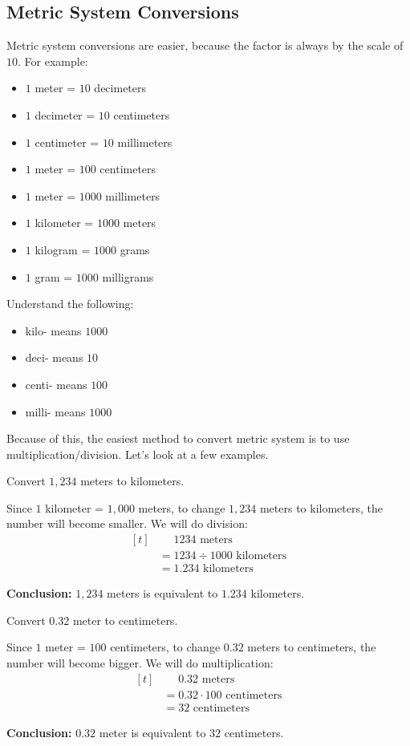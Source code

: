 \subsection{Metric System Conversions}
Metric system conversions are easier, because the factor is always by the scale of $10$. For example:
\begin{itemize}
\item $1$ meter = $10$ decimeters
\item $1$ decimeter = $10$ centimeters
\item $1$ centimeter = $10$ millimeters
\item $1$ meter = $100$ centimeters
\item $1$ meter = $1000$ millimeters
\item $1$ kilometer = $1000$ meters
\item $1$ kilogram = $1000$ grams
\item $1$ gram = $1000$ milligrams
\end{itemize}

Understand the following:
\begin{itemize}
\item kilo- means $1000$
\item deci- means $10$
\item centi- means $100$
\item milli- means $1000$
\end{itemize}

Because of this, the easiest method to convert metric system is to use multiplication/division. Let's look at a few examples.

\begin{myexample}
Convert $1,234$ meters to kilometers.
\end{myexample}
\begin{solution}
Since $1$ kilometer = $1,000$ meters, to change $1,234$ meters to kilometers, the number will become smaller. We will do division:
\[
\begin{aligned}[t]
	&\phantom{{}=} 1234 \text{ meters} \\
	&= 1234 \div 1000 \text{ kilometers} \\
	&= 1.234 \text{ kilometers}
\end{aligned}
\]

\textbf{Conclusion:} $1,234$ meters is equivalent to $1.234$ kilometers.
\end{solution}

\begin{myexample}
Convert $0.32$ meter to centimeters.
\end{myexample}
\begin{solution}
Since $1$ meter = $100$ centimeters, to change $0.32$ meters to centimeters, the number will become bigger. We will do multiplication:
\[
\begin{aligned}[t]
	&\phantom{{}=} 0.32 \text{ meters} \\
	&= 0.32 \cdot 100 \text{ centimeters} \\
	&= 32 \text{ centimeters}
\end{aligned}
\]

\textbf{Conclusion:} $0.32$ meter is equivalent to $32$ centimeters.
\end{solution}

